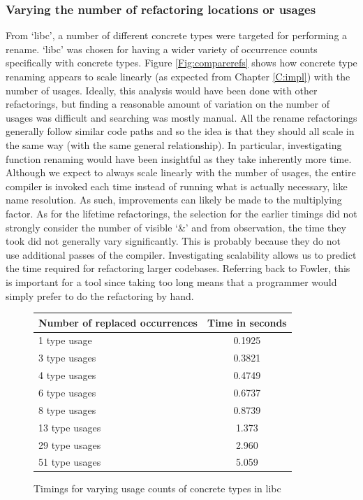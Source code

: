 \subsubsection{Varying the number of refactoring locations or usages}
From `libc', a number of different concrete types were targeted for performing a rename. `libc' was chosen for having a wider variety of occurrence counts specifically with concrete types. Figure \ref{Fig:comparerefs} shows how concrete type renaming appears to scale linearly (as expected from Chapter \ref{C:impl}) with the number of usages. Ideally, this analysis would have been done with other refactorings, but finding a reasonable amount of variation on the number of usages was difficult and searching was mostly manual. All the rename refactorings generally follow similar code paths and so the idea is that they should all scale in the same way (with the same general relationship). In particular, investigating function renaming would have been insightful as they take inherently more time. Although we expect to always scale linearly with the number of usages, the entire compiler is invoked each time instead of running what is actually necessary, like name resolution. As such, improvements can likely be made to the multiplying factor. As for the lifetime refactorings, the selection for the earlier timings did not strongly consider the number of visible `\&' and from observation, the time they took did not generally vary significantly. This is probably because they do not use additional passes of the compiler. Investigating scalability allows us to predict the time required for refactoring larger codebases. Referring back to Fowler, this is important for a tool since taking too long means that a programmer would simply prefer to do the refactoring by hand.


\begin{figure}[h]
\begin{center}
    \begin{tabular}{ | l | c |}
    \hline
    \textbf{Number of replaced occurrences} & \textbf{Time in seconds} \\ \hline
    1 type usage &  0.1925  \\ \hline
    3 type usages &  0.3821  \\ \hline
    4 type usages &   0.4749  \\ \hline
    6 type usages &   0.6737  \\ \hline
    8 type usages &   0.8739 \\ \hline
    13 type usages  &  1.373 \\ \hline
    29 type usages &  2.960  \\ \hline
    51 type usages &  5.059 \\ \hline
    \end{tabular}
\end{center}

\caption{Timings for varying usage counts of concrete types in libc}
\label{Fig:scaling}
\end{figure}

